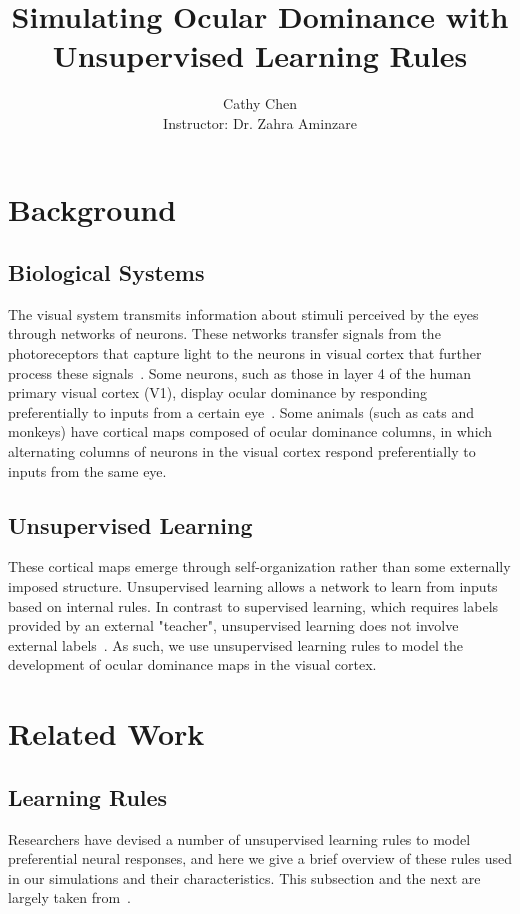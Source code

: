 \documentclass[pageno]{mat323paper}
\begin{document}
\title{Simulating Ocular Dominance with Unsupervised Learning Rules}

\author{Cathy Chen\\Instructor: Dr. Zahra Aminzare}
\date{}
\maketitle
	
\section{Background}
\subsection{Biological Systems}
The visual system transmits information about stimuli perceived by the eyes through networks of neurons. These networks transfer signals from the photoreceptors that capture light to the neurons in visual cortex that further process these signals~\cite{wolfe_sensation_2014}. Some neurons, such as those in layer 4 of the human primary visual cortex (V1), display ocular dominance by responding preferentially to inputs from a certain eye~\cite{miller_receptive_1996}. Some animals (such as cats and monkeys) have cortical maps composed of ocular dominance columns, in which alternating columns of neurons in the visual cortex respond preferentially to inputs from the same eye.

\subsection{Unsupervised Learning}
These cortical maps emerge through self-organization rather than some externally imposed structure. Unsupervised learning allows a network to learn from inputs based on internal rules. In contrast to supervised learning, which requires labels provided by an external "teacher", unsupervised learning does not involve external labels~\cite{dayan_theoretical_2000}. As such, we use unsupervised learning rules to model the development of ocular dominance maps in the visual cortex.

\section{Related Work}
\subsection{Learning Rules}
Researchers have devised a number of unsupervised learning rules to model preferential neural responses, and here we give a brief overview of these rules used in our simulations and their characteristics. This subsection and the next are largely taken from~\cite{dayan_theoretical_2000}.
\end{document}
